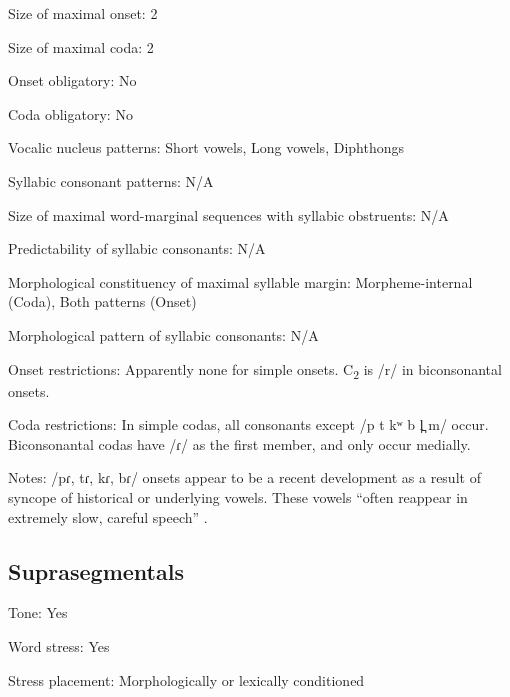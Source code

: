 {\begin{appendixdesc}
\item[Size of maximal onset:] 2

\item[Size of maximal coda:] 2

\item[Onset obligatory:] No

\item[Coda obligatory:] No

\item[Vocalic nucleus patterns:] Short vowels, Long vowels, Diphthongs

\item[Syllabic consonant patterns:] N/A

\item[Size of maximal word-marginal sequences with syllabic obstruents:] N/A

\item[Predictability of syllabic consonants:] N/A

\item[Morphological constituency of maximal syllable margin:] Morpheme-internal (Coda), Both patterns (Onset)

\item[Morphological pattern of syllabic consonants:] N/A

\item[Onset restrictions:] Apparently none for simple onsets. C\textsubscript{2} is /r/ in biconsonantal onsets.

\item[Coda restrictions:] In simple codas, all consonants except /p t kʷ b l̪ m/ occur. Biconsonantal codas have /ɾ/ as the first member, and only occur medially.

\item[Notes:] /pɾ, tɾ, kɾ, bɾ/ onsets appear to be a recent development as a result of syncope of historical or underlying vowels. These vowels “often reappear in extremely slow, careful speech” \citep[20]{Holt1999}.
\end{appendixdesc}
\subsection*{Suprasegmentals}
\begin{appendixdesc}
\item[Tone:] Yes

\item[Word stress:] Yes

\item[Stress placement:] Morphologically or lexically conditioned


\end{appendixdesc}}
